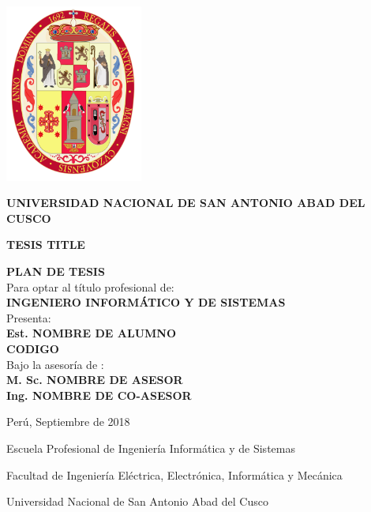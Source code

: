 \begin{center}
\includegraphics[width=0.34\textwidth]{figs/cover/logo-unsaac.png}
\end{center}
\begin{center} {\small \bf UNIVERSIDAD NACIONAL DE SAN ANTONIO ABAD DEL CUSCO} \end{center}


\begin{center} {\normalsize \bf {\textsc{{TESIS TITLE}}}} \end{center}


\begin{flushright}
{
\textbf{PLAN DE TESIS\\}
\vspace{0.5 cm}
Para optar al título profesional de:\\ \textbf{INGENIERO INFORMÁTICO Y DE SISTEMAS} \\
 Presenta:\\ \textbf{Est. NOMBRE DE ALUMNO \\ CODIGO} \\
 Bajo la asesoría de :\\ \textbf{M. Sc. NOMBRE DE ASESOR \\ Ing. NOMBRE DE CO-ASESOR} \\
}
\end{flushright}

\vspace{1.0 cm}
\begin{center} { Perú, Septiembre de 2018} \end{center}
\vspace{1.0 cm}

\begin{center} {\normalsize  Escuela Profesional de Ingeniería Informática y de Sistemas} \end{center}
\begin{center} {\normalsize  Facultad de Ingeniería Eléctrica, Electrónica, Informática y Mecánica} \end{center}
\begin{center} {\normalsize Universidad Nacional de San Antonio Abad del Cusco} \end{center}

\clearpage


